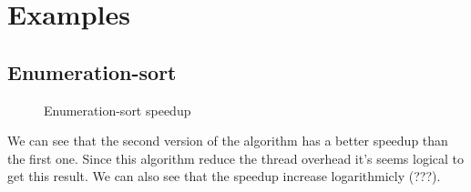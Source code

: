 \chapter{Examples}

\section{Enumeration-sort}

\begin{figure}[!h]
  \begin{center}
  \end{center}
  \caption{Enumeration-sort speedup}
  \label{fig:enum_sort}
\end{figure}

We can see that the second version of the algorithm has a better speedup than the first one. Since this algorithm reduce the thread overhead it's seems logical to get this result. We can also see that the speedup increase logarithmicly (???).
